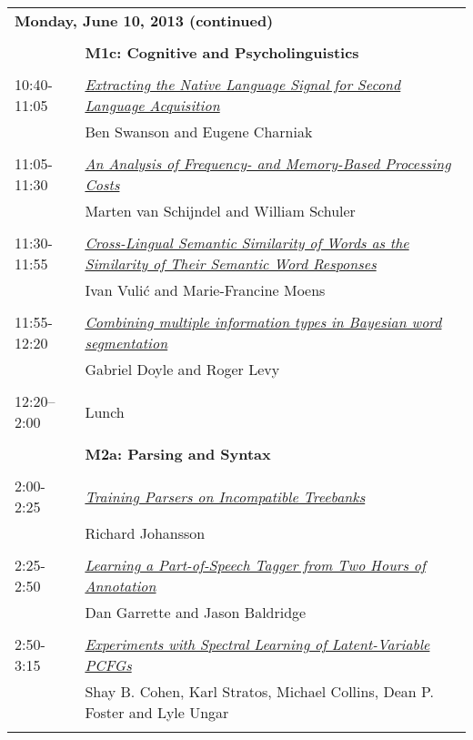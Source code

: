 \begin{tabular}{p{20mm}p{138mm}}
\\
\multicolumn{2}{l}{\bf Monday, June 10, 2013
 (continued)} \\\\
 & {\bf M1c: Cognitive and Psycholinguistics
} \\
\\
10:40-11:05 & \hyperlink{page.85}{\em Extracting the Native Language Signal for Second Language Acquisition}\\
         & Ben Swanson and Eugene Charniak \\
\\

11:05-11:30 & \hyperlink{page.95}{\em An Analysis of Frequency- and Memory-Based Processing Costs}\\
         & Marten van Schijndel and William Schuler \\
\\

11:30-11:55 & \hyperlink{page.106}{\em Cross-Lingual Semantic Similarity of Words as the Similarity of Their Semantic Word Responses}\\
         & Ivan Vuli\'{c} and Marie-Francine Moens \\
\\

11:55-12:20 & \hyperlink{page.117}{\em Combining multiple information types in Bayesian word segmentation}\\
         & Gabriel Doyle and Roger Levy \\
\\

12:20--2:00 & Lunch
 \\
\\
 & {\bf M2a: Parsing and Syntax
} \\
\\
2:00-2:25 & \hyperlink{page.127}{\em Training Parsers on Incompatible Treebanks}\\
         & Richard Johansson \\
\\

2:25-2:50 & \hyperlink{page.138}{\em Learning a Part-of-Speech Tagger from Two Hours of Annotation}\\
         & Dan Garrette and Jason Baldridge \\
\\

2:50-3:15 & \hyperlink{page.148}{\em Experiments with Spectral Learning of Latent-Variable PCFGs}\\
         & Shay B. Cohen, Karl Stratos, Michael Collins, Dean P. Foster and Lyle Ungar \\
\\

\end{tabular}
